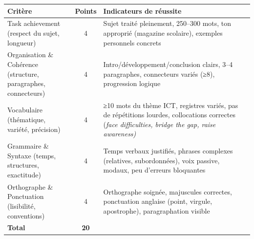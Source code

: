 \documentclass[11pt]{article}
\newcommand{\cle}[1]{{\popxbold\color{popdark}#1}}
\newcommand{\eng}[1]{\ifmmode\text{\textit{#1}}\else\begingroup\selectlanguage{english}\itshape #1\endgroup\fi}
\begin{document}
\begin{propriete}
\begin{center}
\begin{tabularx}{\linewidth}{|X|c|X|}
\hline
\rowcolor{popblueL} \textbf{Critère} & \textbf{Points} & \textbf{Indicateurs de réussite} \\
\hline
\cle{Task achievement} (respect du sujet, longueur) & 4 & Sujet traité pleinement, 250–300 mots, ton approprié (magazine scolaire), exemples personnels concrets \\
\hline
\cle{Organisation \& Cohérence} (structure, paragraphes, connecteurs) & 4 & Intro/développement/conclusion clairs, 3–4 paragraphes, connecteurs variés (≥8), progression logique \\
\hline
\cle{Vocabulaire} (thématique, variété, précision) & 4 & ≥10 mots du thème ICT, registres variés, pas de répétitions lourdes, collocations correctes (\eng{face difficulties, bridge the gap, raise awareness}) \\
\hline
\cle{Grammaire \& Syntaxe} (temps, structures, exactitude) & 4 & Temps verbaux justifiés, phrases complexes (relatives, subordonnées), voix passive, modaux, peu d'erreurs bloquantes \\
\hline
\cle{Orthographe \& Ponctuation} (lisibilité, conventions) & 4 & Orthographe soignée, majuscules correctes, ponctuation anglaise (point, virgule, apostrophe), paragraphation visible \\
\hline
\textbf{Total} & \textbf{20} & \\
\hline
\end{tabularx}
\end{center}
\end{propriete}
\end{document}
